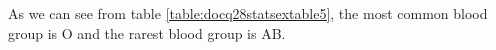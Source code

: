 As we can see from table \ref{table:docq28statsextable5}, the most common blood group is O and the rarest blood group is AB.
	\begin{table}[ht]
	\begin{center}
    	
	\caption{}
	\label{table:docq28statsextable5}
	\end{center}
	\end{table}

  
